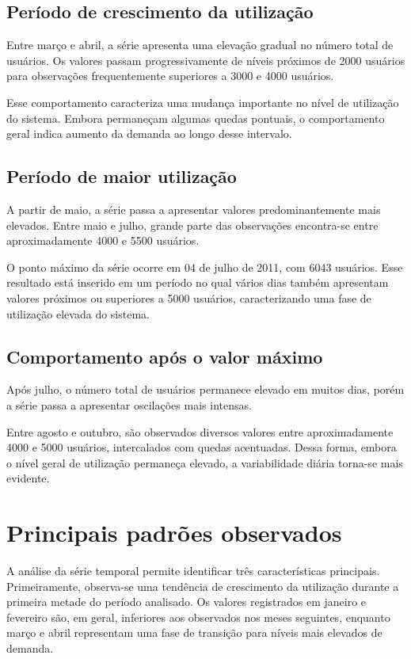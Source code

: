 \documentclass[12pt,a4paper]{article}
\begin{document}
\subsection{Período de crescimento da utilização}

Entre março e abril, a série apresenta uma elevação gradual no número total de
usuários. Os valores passam progressivamente de níveis próximos de 2000 usuários
para observações frequentemente superiores a 3000 e 4000 usuários.

Esse comportamento caracteriza uma mudança importante no nível de utilização do
sistema. Embora permaneçam algumas quedas pontuais, o comportamento geral indica
aumento da demanda ao longo desse intervalo.

\subsection{Período de maior utilização}

A partir de maio, a série passa a apresentar valores predominantemente mais
elevados. Entre maio e julho, grande parte das observações encontra-se entre
aproximadamente 4000 e 5500 usuários.

O ponto máximo da série ocorre em 04 de julho de 2011, com 6043 usuários. Esse
resultado está inserido em um período no qual vários dias também apresentam
valores próximos ou superiores a 5000 usuários, caracterizando uma fase de
utilização elevada do sistema.

\subsection{Comportamento após o valor máximo}

Após julho, o número total de usuários permanece elevado em muitos dias, porém
a série passa a apresentar oscilações mais intensas.

Entre agosto e outubro, são observados diversos valores entre aproximadamente
4000 e 5000 usuários, intercalados com quedas acentuadas. Dessa forma, embora o
nível geral de utilização permaneça elevado, a variabilidade diária torna-se
mais evidente.

\section{Principais padrões observados}

A análise da série temporal permite identificar três características principais.
Primeiramente, observa-se uma tendência de crescimento da utilização durante a
primeira metade do período analisado. Os valores registrados em janeiro e
fevereiro são, em geral, inferiores aos observados nos meses seguintes, enquanto
março e abril representam uma fase de transição para níveis mais elevados de
demanda.
\end{document}

